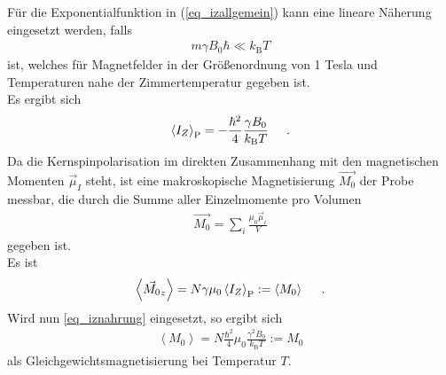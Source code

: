\documentclass[]{scrartcl}
\begin{document}
Für die Exponentialfunktion in (\ref{eq_izallgemein}) kann eine lineare Näherung eingesetzt werden, falls
\begin{align}
m\gamma B_0 \hbar \ll k_\text{B}T 
\end{align}
ist, welches für Magnetfelder in der Größenordnung von 1 Tesla und Temperaturen nahe der Zimmertemperatur gegeben ist.\\
Es ergibt sich
\begin{align}
\left\langle I_Z \right\rangle_{\text{P}}= -\frac{\hbar^2}{4}\frac{\gamma B_0}{k_\text{B}T}\hspace*{0.5cm}\text{.} \label{eq_iznahrung}
\end{align}
Da die Kernspinpolarisation im direkten Zusammenhang mit den magnetischen Momenten $\vec{\mu}_I$ steht, ist eine makroskopische Magnetisierung $\vec{M_0}$ der Probe messbar, die durch die Summe aller Einzelmomente pro Volumen
\begin{align}
\vec{M_0}=\sum\limits_{i}^{}\frac{\mu_0\vec{\mu}_i}{V}
\end{align}
gegeben ist.\\
Es ist
\begin{align}
\left\langle \vec{M_0}_z \right\rangle =N\gamma \mu_0 \left\langle I_Z \right\rangle_{\text{P}} :=\left\langle M_0 \right\rangle\hspace*{0.5cm}\text{.}
\end{align}
Wird nun \ref{eq_iznahrung} eingesetzt, so ergibt sich
\begin{align}
\left\langle M_0 \right\rangle = N\frac{\hbar^2}{4}\mu_0\frac{\gamma^2 B_0}{k_\text{B}T}:=M_0
\end{align}
als Gleichgewichtsmagnetisierung bei Temperatur $T$.
\end{document}
